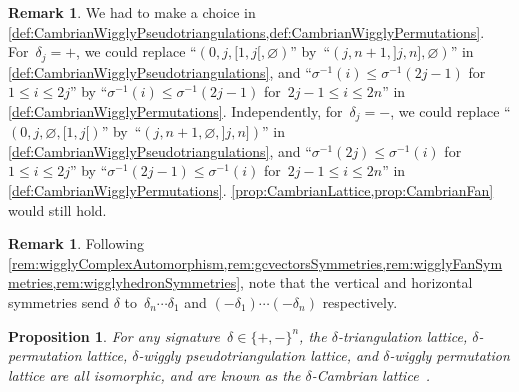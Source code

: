 \documentclass{amsart}
\newtheorem{proposition}[theorem]{Proposition}
\theoremstyle{definition}
\newtheorem{remark}[theorem]{Remark}
\newcommand{\darkblue}{\color{darkblue}} %
\newcommand{\defn}[1]{\textsl{\darkblue #1}} %
\begin{document}
\begin{remark}
We had to make a choice in \cref{def:CambrianWigglyPseudotriangulations,def:CambrianWigglyPermutations}.
For~$\delta_j = {+}$, we could replace ``$(0, j, {[1,j[}, \varnothing)$'' by~``$(j, n+1, {]j,n]}, \varnothing)$'' in \cref{def:CambrianWigglyPseudotriangulations}, and ``$\sigma^{-1}(i) \le \sigma^{-1}(2j-1)$ for~$1 \le i \le 2j$'' by ``$\sigma^{-1}(i) \le \sigma^{-1}(2j-1)$ for~$2j-1 \le i \le 2n$'' in \cref{def:CambrianWigglyPermutations}.
Independently, for~$\delta_j = {-}$, we could replace ``$(0, j, \varnothing, {[1,j[})$'' by~``$(j, n+1, \varnothing, {]j,n]})$'' in \cref{def:CambrianWigglyPseudotriangulations}, and ``$\sigma^{-1}(2j) \le \sigma^{-1}(i)$ for~$1 \le i \le 2j$'' by ``$\sigma^{-1}(2j-1) \le \sigma^{-1}(i)$ for~$2j-1 \le i \le 2n$'' in \cref{def:CambrianWigglyPermutations}.
\cref{prop:CambrianLattice,prop:CambrianFan} would still hold.
\end{remark}

\begin{remark}
\label{rem:CambrianSymmetries}
Following \cref{rem:wigglyComplexAutomorphism,rem:gcvectorsSymmetries,rem:wigglyFanSymmetries,rem:wigglyhedronSymmetries}, note that the vertical and horizontal symmetries send $\delta$ to~$\delta_n \cdots \delta_1$ and $(-\delta_1) \cdots (-\delta_n)$ respectively.
\end{remark}

\pagebreak
\begin{proposition}
\label{prop:CambrianLattice}
For any signature~$\delta \in \{+,-\}^n$, the $\delta$-triangulation lattice, $\delta$-permutation lattice, \mbox{$\delta$-wiggly} pseudotriangulation lattice, and $\delta$-wiggly permutation lattice are all isomorphic, and are known as the \defn{$\delta$-Cambrian lattice}~\cite{Reading-CambrianLattices}.
\end{proposition}
\end{document}
